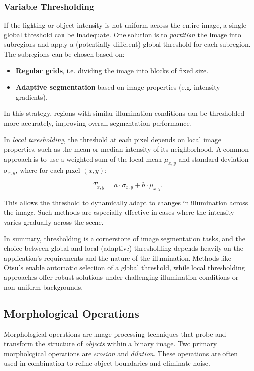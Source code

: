 \documentclass[a4paper,12pt]{article}
\begin{document}
\subsubsection{Variable Thresholding}

If the lighting or object intensity is not uniform across the entire image, a single global threshold can be inadequate. One solution is to \emph{partition} the image into subregions and apply a (potentially different) global threshold for each subregion. The subregions can be chosen based on:
\begin{itemize}
    \item \textbf{Regular grids}, i.e. dividing the image into blocks of fixed size.
    \item \textbf{Adaptive segmentation} based on image properties (e.g. intensity gradients).
\end{itemize}

In this strategy, regions with similar illumination conditions can be thresholded more accurately, improving overall segmentation performance.

In \emph{local thresholding}, the threshold at each pixel depends on local image properties, such as the mean or median intensity of its neighborhood. A common approach is to use a weighted sum of the local mean \(\mu_{x,y}\) and standard deviation \(\sigma_{x,y}\), where for each pixel \((x, y)\):

\[
T_{x,y} = a \cdot \sigma_{x,y} + b \cdot \mu_{x,y}.
\]

This allows the threshold to dynamically adapt to changes in illumination across the image. Such methods are especially effective in cases where the intensity varies gradually across the scene.

In summary, thresholding is a cornerstone of image segmentation tasks, and the choice between global and local (adaptive) thresholding depends heavily on the application’s requirements and the nature of the illumination. Methods like Otsu's enable automatic selection of a global threshold, while local thresholding approaches offer robust solutions under challenging illumination conditions or non-uniform backgrounds.

\subsection{Morphological Operations}

Morphological operations are image processing techniques that probe and transform the structure of \emph{objects} within a binary image. Two primary morphological operations are \textit{erosion} and \textit{dilation}. These operations are often used in combination to refine object boundaries and eliminate noise.
\end{document}
